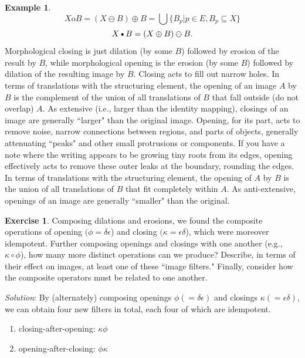 \documentclass[a4paper]{book}
\theoremstyle{definition}
\newtheorem{example}{Example}[section]
\theoremstyle{definition}
\theoremstyle{definition}
\theoremstyle{theorem}
\theoremstyle{definition}
\newtheorem{exercise}{Exercise}[section]
\begin{document}
\begin{example}
	\begin{equation}
	X \text{o} B = (X \ominus B) \oplus B = \bigcup \{B_p | p \in E, B_p \subseteq  X\}
	\end{equation}
	\begin{equation}
	X \text{\textbullet} B = (X \oplus B) \ominus B.
	\end{equation}
	Morphological closing is just dilation (by some $B$) followed by erosion of the result by $B$, while morphological opening is the erosion (by some $B$) followed by dilation of the resulting image by $B$. Closing acts to fill out narrow holes. In terms of translations with the structuring element, the opening of an image $A$ by $B$ is the complement of the union of all translations of $B$ that fall outside (do not overlap) $A$. As extensive (i.e., larger than the identity mapping), closings of an image are generally ``larger" than the original image. Opening, for its part, acts to remove noise, narrow connections between regions, and parts of objects, generally attenuating ``peaks" and other small protrusions or components. If you have a note where the writing appears to be growing tiny roots from its edges, opening effectively acts to remove these outer leaks at the boundary, rounding the edges. In terms of translations with the structuring element, the opening of $A$ by $B$ is the union of all translations of $B$ that fit completely within $A$. As anti-extensive, openings of an image are generally ``smaller" than the original. 
	\begin{exercise}
		Composing dilations and erosions, we found the composite operations of opening $(\phi = \delta \epsilon$) and closing $(\kappa = \epsilon \delta$), which were moreover idempotent. Further composing openings and closings with one another (e.g., $\kappa \circ \phi$), how many more distinct operations can we produce? Describe, in terms of their effect on images, at least one of these ``image filters." Finally, consider how the composite operators must be related to one another.   
	\end{exercise}
	\noindent
	\textit{Solution}: By (alternately) composing openings $\phi (= \delta \epsilon)$ and closings $\kappa (= \epsilon \delta)$, we can obtain four new filters in total, each four of which are idempotent. 
	\begin{enumerate}
		\item closing-after-opening: $\kappa \phi$
		\item opening-after-closing: $\phi \kappa$

\end{enumerate}
\end{example}
\end{document}
